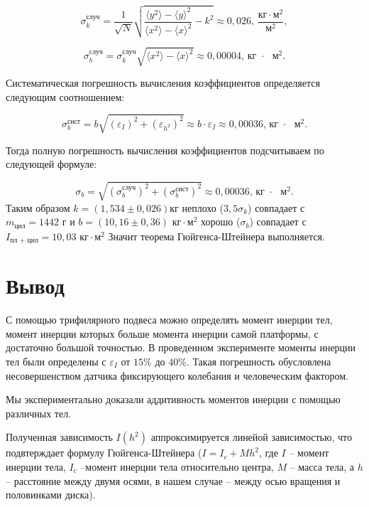 \documentclass[a4paper,14pt]{extarticle}
\begin{document}
	\begin{equation}
		\sigma_k^\text{случ}=\frac{1}{\sqrt{N}}\sqrt{\frac{\langle y^2 \rangle - \langle y \rangle^2}{\langle x^2 \rangle - \langle x \rangle^2} - k^2  } \approx 0,026
		 \text{, } \frac{\text{кг}\cdot\text{м}^2}{\text{м}^2},
	\end{equation}
	
	\begin{equation}
		\sigma_b^\text{случ}= \sigma_k^\text{случ} \sqrt{\langle x^2 \rangle - \langle x \rangle^2} \approx 0,00004
		\text{,  кг $\cdot$ $\text{м}^2$}.
	\end{equation}
	
	Систематическая погрешность вычисления коэффициентов определяется следующим соотношением:
	
	\begin{equation}
		\sigma^\text{сист}_b = b\sqrt{\left( \varepsilon_{I} \right)^2 + \left( \varepsilon_{h^2} \right)^2 } \approx b \cdot \varepsilon_I \approx 0,00036 \text{,  кг $\cdot$ $\text{м}^2$}.
	\end{equation}
	
	Тогда полную погрешность вычисления коэффициентов подсчитываем по следующей формуле:
	
	\begin{equation}
		\sigma_b = \sqrt{\left( \sigma_b^\text{случ} \right)^2 + \left( \sigma_b^\text{сист} \right)^2 } \approx 0,00036 \text{,  кг $\cdot$ $\text{м}^2$}.
	\end{equation}
	Таким образом $k = (1,534 \pm 0,026)\text{кг}$ неплохо ($3,5\sigma_k$) совпадает с $m_\text{цил} = 1442 \text{ г}$ и $b = (10,16 \pm 0,36)\text{ кг} \cdot \text{м}^2$ хорошо ($\sigma_b$) совпадает с $I_\text{пл + цил} = 10,03\text{ кг} \cdot \text{м}^2 $
	Значит теорема Гюйгенса-Штейнера выполняется.
	\section{Вывод}
	
	С помощью трифилярного подвеса можно определять момент инерции тел, момент инерции которых больше момента инерции самой платформы, с достаточно большой точностью. В проведенном эксперименте моменты инерции тел были определены с $\varepsilon_I$ от $15\%$ до $40\%$. Такая погрешность обусловлена несовершенством датчика фиксирующего колебания и человеческим фактором.
	
	Мы экспериментально доказали аддитивность моментов инерции с помощью различных тел.
	
	Полученная зависимость $I(h^2)$ аппроксимируется линейой зависимостью, что подвтерждает формулу Гюйгенса-Штейнера ($I = I_c + Mh^2$, где $I$ -- момент инерции тела, $I_c$ --момент инерции тела относительно центра, $M$ -- масса тела, а $h$ -- расстояние между двумя осями, в нашем случае -- между осью вращения и половинками диска).
	
\end{document}
